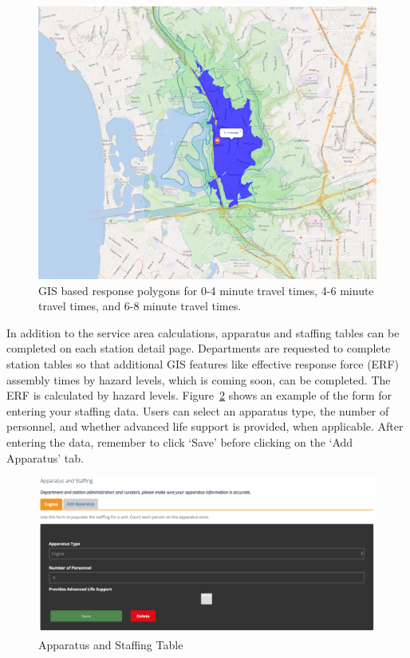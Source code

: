 \documentclass[12pt,oneside]{book}
\begin{document}
\begin{figure}[ht!]
\centering
\includegraphics[width=.9\columnwidth]{Figures/response_area}
\caption{GIS based response polygons for 0-4 minute travel times, 4-6 minute travel times, and 6-8 minute travel times.}
\label{fig:response_area}
\end{figure}

In addition to the service area calculations, apparatus and staffing tables can be completed on each station detail page. Departments are requested to complete station tables so that additional GIS features like effective response force (ERF) assembly times by hazard levels, which is coming soon, can be completed. The ERF is calculated by hazard levels. Figure~\ref{fig:staffing} shows an example of the form for entering your staffing data. Users can select an apparatus type, the number of personnel, and whether advanced life support is provided, when applicable. After entering the data, remember to click `Save' before clicking on the `Add Apparatus' tab.

\begin{figure}[ht!]
\centering
\includegraphics[width=.9\columnwidth]{Figures/staffing}
\caption{Apparatus and Staffing Table}
\label{fig:staffing}
\end{figure}
\end{document}
